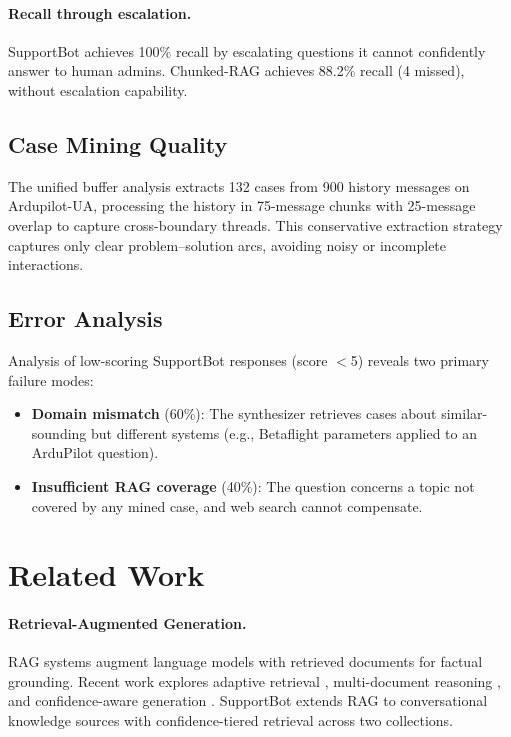\documentclass[11pt]{article}
\begin{document}
\paragraph{Recall through escalation.} SupportBot achieves 100\% recall by escalating questions it cannot confidently answer to human admins. Chunked-RAG achieves 88.2\% recall (4 missed), without escalation capability.

\subsection{Case Mining Quality}

The unified buffer analysis extracts 132 cases from 900 history messages on Ardupilot-UA, processing the history in 75-message chunks with 25-message overlap to capture cross-boundary threads. This conservative extraction strategy captures only clear problem--solution arcs, avoiding noisy or incomplete interactions.

\subsection{Error Analysis}

Analysis of low-scoring SupportBot responses (score $<$5) reveals two primary failure modes:
\begin{itemize}
    \item \textbf{Domain mismatch} (60\%): The synthesizer retrieves cases about similar-sounding but different systems (e.g., Betaflight parameters applied to an ArduPilot question).
    \item \textbf{Insufficient RAG coverage} (40\%): The question concerns a topic not covered by any mined case, and web search cannot compensate.
\end{itemize}

\section{Related Work}

\paragraph{Retrieval-Augmented Generation.} RAG systems \citep{lewis2020rag,guu2020realm,borgeaud2022retro} augment language models with retrieved documents for factual grounding. Recent work explores adaptive retrieval \citep{asai2024selfrag}, multi-document reasoning \citep{trivedi2023interleaving}, and confidence-aware generation \citep{kadavath2022language}. SupportBot extends RAG to conversational knowledge sources with confidence-tiered retrieval across two collections.
\end{document}
